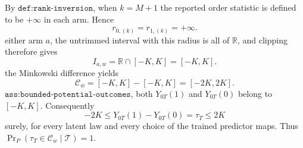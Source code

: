 By \(\texttt{def:rank-inversion}\), when \(k=M+1\) the reported order statistic is defined to be \(+\infty\) in each arm. Hence\n\[r_{0,(k)}=r_{1,(k)}=+\infty.\]\nFor either arm \(a\), the untrimmed interval with this radius is all of \(\mathbb R\), and clipping therefore gives\n\[I_{a,w}=\mathbb R\cap[-K,K]=[-K,K].\]\nTaking the Minkowski difference yields\n\[\mathcal C_w=[-K,K]-[-K,K]=[-2K,2K].\]\nBy \(\texttt{ass:bounded-potential-outcomes}\), both \(Y_{0T}(1)\) and \(Y_{0T}(0)\) belong to \([-K,K]\). Consequently\n\[-2K\le Y_{0T}(1)-Y_{0T}(0)=\tau_T\le2K\]\nalmost surely, for every latent law and every choice of the trained predictor maps. Thus \(\Pr_P(\tau_T\in\mathcal C_w\mid\mathcal T)=1\).
